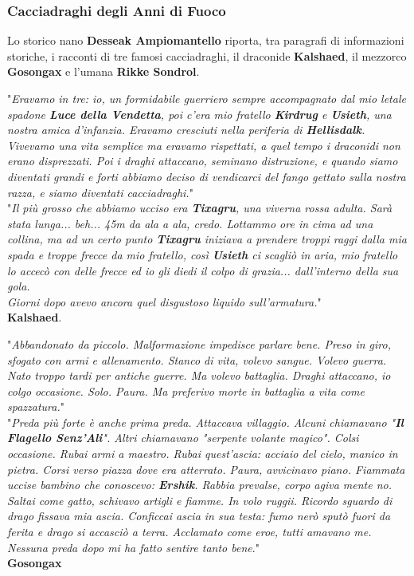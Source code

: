 \documentclass[10pt,twoside,onecolumn,openany]{book}
\begin{document}
\subsubsection{Cacciadraghi degli Anni di Fuoco}
Lo storico nano \textbf{Desseak Ampiomantello} riporta, tra paragrafi di informazioni storiche, i racconti di tre famosi cacciadraghi, il draconide \textbf{Kalshaed}, il mezzorco \textbf{Gosongax} e l'umana \textbf{Rikke Sondrol}.
\begin{quotebox}
	"\textit{Eravamo in tre: io, un formidabile guerriero sempre accompagnato dal mio letale spadone \textbf{Luce della Vendetta}, poi c'era mio fratello \textbf{Kirdrug} e \textbf{Usieth}, una nostra amica d'infanzia. Eravamo cresciuti nella periferia di \textbf{Hellisdalk}. Vivevamo una vita semplice ma eravamo rispettati, a quel tempo i draconidi non erano disprezzati. Poi i draghi attaccano, seminano distruzione, e quando siamo diventati grandi e forti abbiamo deciso di vendicarci del fango gettato sulla nostra razza, e siamo diventati cacciadraghi.}"\\
	"\textit{Il più grosso che abbiamo ucciso era \textbf{Tixagru}, una viverna rossa adulta. Sarà stata lunga... beh... 45m da ala a ala, credo. Lottammo ore in cima ad una collina, ma ad un certo punto \textbf{Tixagru} iniziava a prendere troppi raggi dalla mia spada e troppe frecce da mio fratello, così \textbf{Usieth} ci scagliò in aria, mio fratello lo accecò con delle frecce ed io gli diedi il colpo di grazia... dall'interno della sua gola.\\
	Giorni dopo avevo ancora quel disgustoso liquido sull'armatura.}"\\
	\textbf{Kalshaed}.
\end{quotebox}
\begin{quotebox}
	"\textit{Abbandonato da piccolo. Malformazione impedisce parlare bene. Preso in giro, sfogato con armi e allenamento. Stanco di vita, volevo sangue. Volevo guerra. Nato troppo tardi per antiche guerre. Ma volevo battaglia. Draghi attaccano, io colgo occasione. Solo. Paura. Ma preferivo morte in battaglia a vita come spazzatura.}"\\
	"\textit{Preda più forte è anche prima preda. Attaccava villaggio. Alcuni chiamavano "\textbf{Il Flagello Senz'Ali}". Altri chiamavano "serpente volante magico". Colsi occasione. Rubai armi a maestro. Rubai quest'ascia: acciaio del cielo, manico in pietra. Corsi verso piazza dove era atterrato. Paura, avvicinavo piano. Fiammata uccise bambino che conoscevo: \textbf{Ershik}. Rabbia prevalse, corpo agiva mente no. Saltai come gatto, schivavo artigli e fiamme. In volo ruggii. Ricordo sguardo di drago fissava mia ascia. Conficcai ascia in sua testa: fumo nerò sputò fuori da ferita e drago si accasciò a terra. Acclamato come eroe, tutti amavano me.\\
	Nessuna preda dopo mi ha fatto sentire tanto bene}."\\
	\textbf{Gosongax}
\end{quotebox}
\end{document}
